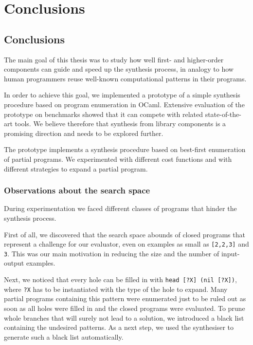 \chapter{Conclusions} \label{ch:conclusions}

\section{Conclusions}

The main goal of this thesis was to study how well first- and higher-order components can guide and speed up the synthesis process, in analogy to how human programmers reuse well-known computational patterns in their programs.

In order to achieve this goal, we implemented a prototype of a simple synthesis procedure based on program enumeration in OCaml. Extensive evaluation of the prototype on benchmarks showed that it can compete with related state-of-the-art tools. We believe therefore that synthesis from library components is a promising direction and needs to be explored further.

The prototype implements a synthesis procedure based on best-first enumeration of partial programs. We experimented with different cost functions and with different strategies to expand a partial program.

\subsection{Observations about the search space}\label{observations}
During experimentation we faced different classes of programs that hinder the synthesis process.

First of all, we discovered that the search space abounds of closed programs that represent a challenge for our evaluator, even on examples as small as \lstinline![2,2,3]! and \lstinline!3!. This was our main motivation in reducing the size and the number of input-output examples.

Next, we noticed that every hole can be filled in with \lstinline!head [?X] (nil [?X])!, where \lstinline!?X! has to be instantiated with the type of the hole to expand. Many partial programs containing this pattern were enumerated just to be ruled out as soon as all holes were filled in and the closed programs were evaluated. To prune whole branches that will surely not lead to a solution, we introduced a black list containing the undesired patterns. As a next step, we used the synthesiser to generate such a black list automatically.

